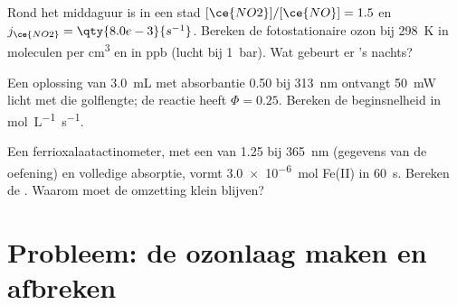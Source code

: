 \begin{exercise}[$\star\star\star$]\label{exo:b3:photochemistry:10}
Rond het middaguur is in een stad $[\ce{NO2}]/[\ce{NO}] = 1.5$ en $j_{\ce{NO2}} = \qty{8.0e-3}{s^{-1}}$. Bereken de
fotostationaire ozon bij \qty{298}{K} in moleculen per \unit{cm^3} en in
ppb (lucht bij \qty{1}{bar}). Wat gebeurt er 's nachts?
\end{exercise}

\begin{exercise}[$\star\star\star$]\label{exo:b3:photochemistry:11}
Een oplossing van \qty{3.0}{mL} met absorbantie 0.50 bij \qty{313}{nm}
ontvangt \qty{50}{mW} licht met die golflengte; de reactie heeft $\Phi = 0.25$. Bereken de beginsnelheid in
\unit{mol.L^{-1}.s^{-1}}.
\end{exercise}

\begin{exercise}[$\star\star\star$]\label{exo:b3:photochemistry:12}
Een ferrioxalaatactinometer, met een  van 1.25 bij
\qty{365}{nm} (gegevens van de oefening) en volledige absorptie, vormt
\qty{3.0e-6}{mol} Fe(II) in \qty{60}{s}. Bereken de . Waarom
moet de omzetting klein blijven?
\end{exercise}

\section{Probleem: de ozonlaag maken en afbreken}

